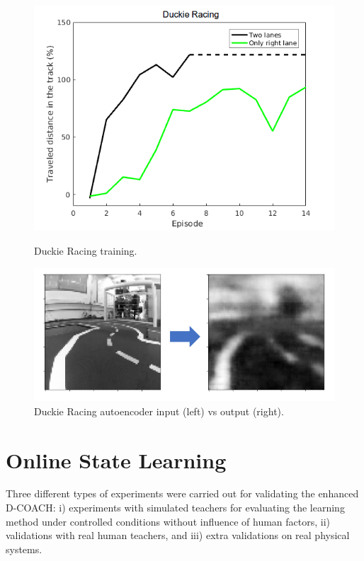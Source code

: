 \begin{figure}[H]
    \centering
    \begin{minipage}{.5\textwidth}
    \vspace{-0.2cm}
    \includegraphics[width=1.0\linewidth]{imagenes/cap3/racing_duckie_results.png}
    \vspace{-0.2cm}
    \caption{Duckie Racing training.}
    \label{fig:racing_duckie_results}
    \end{minipage}%
    \begin{minipage}{.5\textwidth}
    \centering
    \includegraphics[width=1.0\linewidth]{imagenes/cap3/AE_duckie2.png}
    \vspace{-0.2cm}
    \caption{Duckie Racing autoencoder input (left) vs output (right).}
    \label{fig:AE_duckie}
    \end{minipage}
\end{figure}

\section{Online State Learning}
Three different types of experiments were carried out for validating the enhanced D-COACH: i) experiments with simulated teachers for evaluating the learning method under controlled conditions without influence of human factors, ii) validations with real human teachers, and iii) extra validations on real physical systems.

